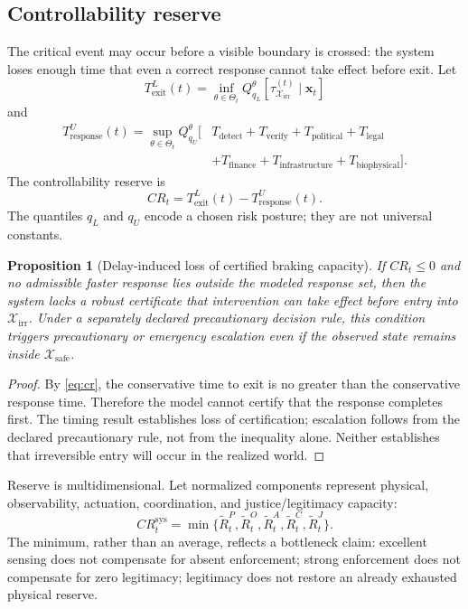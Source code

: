 \documentclass[11pt,a4paper]{article}
\numberwithin{equation}{section}
\theoremstyle{definition}
\theoremstyle{plain}
\newtheorem{proposition}[definition]{Proposition}
\theoremstyle{remark}
\newcommand{\safe}{\mathcal{X}_{\mathrm{safe}}}
\newcommand{\irrev}{\mathcal{X}_{\mathrm{irr}}}
\newcommand{\state}{\bm{x}}
\begin{document}
\subsection{Controllability reserve}

The critical event may occur before a visible boundary is crossed: the system loses enough time that even a correct response cannot take effect before exit. Let
\begin{equation}
T_{\mathrm{exit}}^{L}(t)=
\inf_{\theta\in\Theta_t}
Q_{q_L}^{\theta}\!\left[\tau_{\irrev}^{(t)}\mid\state_t\right]
\label{eq:texit}
\end{equation}
and
\begin{align}
T_{\mathrm{response}}^{U}(t)=
\sup_{\theta\in\Theta_t}Q_{q_U}^{\theta}\big[&
T_{\mathrm{detect}}+T_{\mathrm{verify}}+T_{\mathrm{political}}
+T_{\mathrm{legal}} \nonumber\\
&+T_{\mathrm{finance}}+T_{\mathrm{infrastructure}}
+T_{\mathrm{biophysical}}
\big].
\label{eq:tresponse}
\end{align}
The controllability reserve is
\begin{equation}
\boxed{
CR_t=T_{\mathrm{exit}}^{L}(t)-T_{\mathrm{response}}^{U}(t).
}
\label{eq:cr}
\end{equation}
The quantiles $q_L$ and $q_U$ encode a chosen risk posture; they are not universal constants.

\begin{proposition}[Delay-induced loss of certified braking capacity]
If $CR_t\le0$ and no admissible faster response lies outside the modeled response set, then the system lacks a robust certificate that intervention can take effect before entry into $\irrev$. Under a separately declared precautionary decision rule, this condition triggers precautionary or emergency escalation even if the observed state remains inside $\safe$.
\end{proposition}

\begin{proof}
By \cref{eq:cr}, the conservative time to exit is no greater than the conservative response time. Therefore the model cannot certify that the response completes first. The timing result establishes loss of certification; escalation follows from the declared precautionary rule, not from the inequality alone. Neither establishes that irreversible entry will occur in the realized world.
\end{proof}

Reserve is multidimensional. Let normalized components represent physical, observability, actuation, coordination, and justice/legitimacy capacity:
\begin{equation}
CR_t^{\mathrm{sys}}=
\min\{\widetilde R_t^P,\widetilde R_t^O,
\widetilde R_t^A,\widetilde R_t^C,\widetilde R_t^J\}.
\label{eq:systemreserve}
\end{equation}
The minimum, rather than an average, reflects a bottleneck claim: excellent sensing does not compensate for absent enforcement; strong enforcement does not compensate for zero legitimacy; legitimacy does not restore an already exhausted physical reserve.
\end{document}
